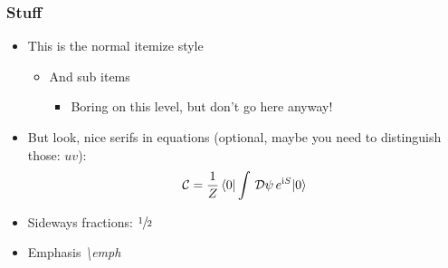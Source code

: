\documentclass[mathserif, fleqn, aspectratio=169]{beamer}
\begin{document}
\begin{frame}\frametitle{Stuff}
  \begin{itemize}
  \item This is the normal itemize style
    \begin{itemize}
    \item And sub items
      \begin{itemize}
      \item Boring on this level, but don't go here anyway!
      \end{itemize}
    \end{itemize}

  \item But look, nice serifs in equations (optional, maybe you need to distinguish those: $uv$):
    \begin{align*}
      \mathcal{C} = \frac1{Z} \braket{0|\int\,\mathcal{D}\psi\,e^{\mathrm{i} S}|0}
    \end{align*}

  \item Sideways fractions: $\sfrac{1}{2}$

  \item Emphasis    \emph{\textbackslash{}emph}
  \end{itemize}
\end{frame}
\end{document}
